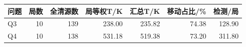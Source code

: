 \begin{tabular}{lrrrrrr}
\toprule
问题 & 局数 & 全清源数 & 局等权T/K & 汇总T/K & 移动占比/\% & 检测/局 \\
\midrule
Q3 & 10 & 139 & 238.00 & 235.82 & 74.38 & 128.90 \\
Q4 & 10 & 138 & 531.18 & 519.38 & 73.20 & 311.80 \\
\bottomrule
\end{tabular}
